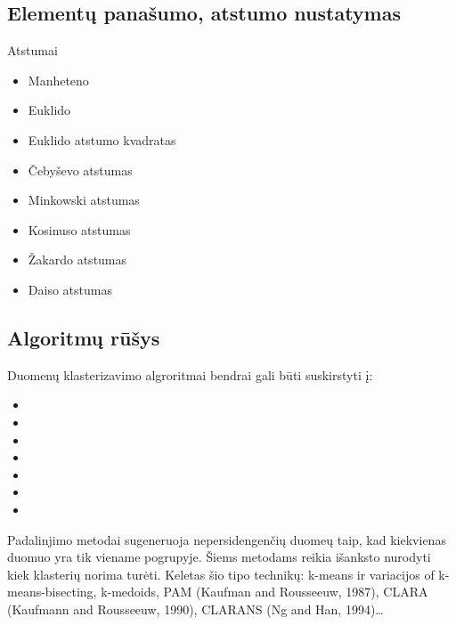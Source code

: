 \documentclass[draft]{VUMIFInfKursinis}
\begin{document}
\subsection{Elementų panašumo, atstumo nustatymas}
Atstumai
\begin{itemize}
	\item Manheteno
	\item Euklido
	\item Euklido atstumo kvadratas
	\item Čebyševo atstumas 
	\item Minkowski atstumas 
	\item Kosinuso atstumas 
	\item Žakardo atstumas 
	\item Daiso atstumas 
\end{itemize}
\subsection{Algoritmų rūšys}
Duomenų klasterizavimo algroritmai bendrai gali būti suskirstyti į\cite{kadhim2014text}: 
\begin{itemize}
	\item {}
	\item {}
	\item {}
	\item {}
	\item {}
	\item {}
	\item {}
\end{itemize}

Padalinjimo metodai sugeneruoja nepersidengenčių duomeų  taip, kad kiekvienas duomuo yra tik viename pogrupyje. Šiems metodams reikia išanksto nurodyti kiek klasterių norima turėti. Keletas šio tipo technikų: k-means ir variacijos of k-means-bisecting, k-medoids, PAM (Kaufman and Rousseeuw, 1987), CLARA (Kaufmann and Rousseeuw, 1990), CLARANS (Ng and Han, 1994)\ldots
\end{document}
